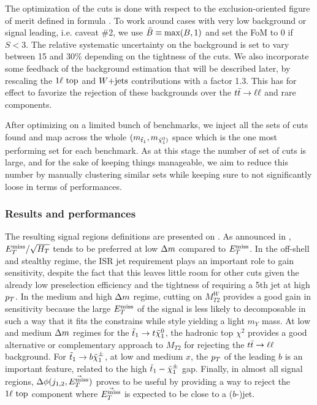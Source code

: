     The optimization of the cuts is done with respect to the exclusion-oriented figure of
    merit defined in formula . To work around cases with very low background or signal leading,
    i.e. caveat \#2, we use $\tilde{B} \equiv \text{max}(B,1)$ and set the FoM to 0
    if $S < 3$. The relative systematic uncertainty on the background is set to vary between
    15 and 30\% depending on the tightness of the cuts. We also incorporate some feedback
    of the background estimation that will be described later, by rescaling the $1\ell~\text{top}$
    and $\text{$W$+jets}$ contributions with a factor 1.3. This has for effect to favorize the
    rejection of these backgrounds over the $t\bar{t} \rightarrow \ell \ell$ and rare components.

    After optimizing on a limited bunch of benchmarks, we inject all the sets of cuts found
    and map across the whole $(m_{\tilde{t}_1},m_{\tilde{\chi}_1^0)}$ space which is the one
    most performing set for each benchmark. As at this stage the number of set of cuts is
    large, and for the sake of keeping things manageable, we aim to reduce this number by
    manually clustering similar sets while keeping sure to not significantly loose in
    terms of performances.

            \subsubsection{Results and performances}

    The resulting signal regions definitions are presented on .
    As announced in , $E_T^\text{miss}/\sqrt{H_T}$ tends to be
    preferred at low $\Delta m$ compared to $E_T^\text{miss}$. In the off-shell and stealthy regime,
    the ISR jet requirement plays an important role to gain sensitivity, despite the
    fact that this leaves little room for other cuts given the already low preselection
    efficiency and the tightness of requiring a 5th jet at high $p_T$.
    In the medium and high $\Delta m$ regime, cutting on $M_{T2}^W$ provides a good gain
    in sensitivity because the large $E_T^\text{miss}$ of the signal is less likely to decomposable
    in such a way that it fits the constrains while style yielding a light $m_Y$ mass.
    At low and medium $\Delta m$ regimes for the $\tilde{t}_1 \rightarrow t \tilde{\chi}_1^0$, the
    hadronic top $\chi^2$ provides a good alternative or complementary approach to $M_{T2}$
    for rejecting the $t\bar{t} \rightarrow \ell \ell$ background. For $\tilde{t}_1 \rightarrow b \tilde{\chi}_1^\pm$,
    at low and medium $x$, the $p_T$ of the leading $b$ is an important feature, related
    to the high $\tilde{t}_1-\tilde{\chi}_1^\pm$ gap. Finally, in almost all signal regions,
    $\Delta\phi(j_{1,2},\vec{E_T^\text{miss}})$ proves to be useful by providing a way to reject the
    $1\ell~\text{top}$ component where $\vec{E_T^\text{miss}}$ is expected to be close to a ($b$-)jet.

